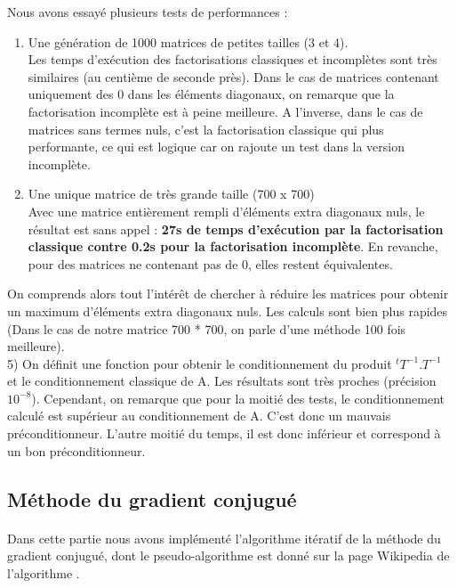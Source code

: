 \documentclass{article}
\begin{document}
  Nous avons essayé plusieurs tests de performances :
  \begin{enumerate}
      \item Une génération de 1000 matrices de petites tailles (3 et 4). \\
      Les temps d'exécution des factorisations classiques et incomplètes sont très similaires (au centième de seconde près).
      Dans le cas de matrices contenant uniquement des 0 dans les éléments diagonaux, on remarque que la factorisation incomplète est à peine meilleure. A l'inverse, dans le cas de matrices sans termes nuls, c'est la factorisation classique qui plus performante, ce qui est logique car on rajoute un test dans la version incomplète. \\
      
      \item Une unique matrice de très grande taille (700 x 700) \\
      Avec une matrice entièrement rempli d'éléments extra diagonaux nuls, le résultat est sans appel : \textbf{27s de temps d'exécution par la factorisation classique contre 0.2s pour la factorisation incomplète}.
      En revanche, pour des matrices ne contenant pas de 0, elles restent équivalentes.
  \end{enumerate}
  
  On comprends alors tout l'intérêt de chercher à réduire les matrices pour obtenir un maximum d'éléments extra diagonaux nuls. Les calculs sont bien plus rapides (Dans le cas de notre matrice 700 * 700, on parle d'une méthode 100 fois meilleure). \\
  
5) On définit une fonction pour obtenir le conditionnement du produit \(^tT^{-1} . T^{-1}\) et le conditionnement classique de A. Les résultats sont très proches (précision \(10^{-8}\)). Cependant, on remarque que pour la moitié des tests, le conditionnement calculé est supérieur au conditionnement de A. C'est donc un mauvais préconditionneur. L'autre moitié du temps, il est donc inférieur et correspond à un bon préconditionneur.


    
\subsection*{Méthode du gradient conjugué}
\paragraph{}
    Dans cette partie nous avons implémenté l'algorithme itératif de la méthode du gradient conjugué, dont le pseudo-algorithme est donné sur la page Wikipedia de l'algorithme \cite{gradconjugwiki}.
\end{document}
